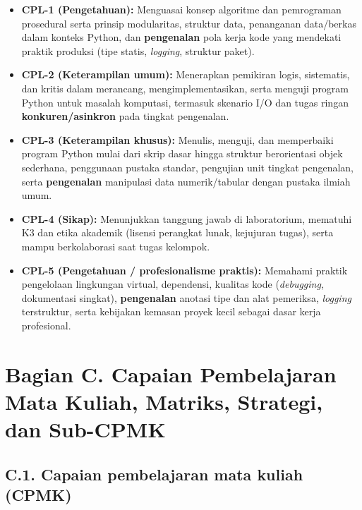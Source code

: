 \documentclass[12pt,a4paper]{article}
\begin{document}
\begin{itemize}[leftmargin=*]
  \item \textbf{CPL-1 (Pengetahuan):} Menguasai konsep algoritme dan pemrograman prosedural serta prinsip modularitas, struktur data, penanganan data/berkas dalam konteks Python, dan \textbf{pengenalan} pola kerja kode yang mendekati praktik produksi (tipe statis, \textit{logging}, struktur paket).
  \item \textbf{CPL-2 (Keterampilan umum):} Menerapkan pemikiran logis, sistematis, dan kritis dalam merancang, mengimplementasikan, serta menguji program Python untuk masalah komputasi, termasuk skenario I/O dan tugas ringan \textbf{konkuren/asinkron} pada tingkat pengenalan.
  \item \textbf{CPL-3 (Keterampilan khusus):} Menulis, menguji, dan memperbaiki program Python mulai dari skrip dasar hingga struktur berorientasi objek sederhana, penggunaan pustaka standar, pengujian unit tingkat pengenalan, serta \textbf{pengenalan} manipulasi data numerik/tabular dengan pustaka ilmiah umum.
  \item \textbf{CPL-4 (Sikap):} Menunjukkan tanggung jawab di laboratorium, mematuhi K3 dan etika akademik (lisensi perangkat lunak, kejujuran tugas), serta mampu berkolaborasi saat tugas kelompok.
  \item \textbf{CPL-5 (Pengetahuan / profesionalisme praktis):} Memahami praktik pengelolaan lingkungan virtual, dependensi, kualitas kode (\textit{debugging}, dokumentasi singkat), \textbf{pengenalan} anotasi tipe dan alat pemeriksa, \textit{logging} terstruktur, serta kebijakan kemasan proyek kecil sebagai dasar kerja profesional.
\end{itemize}

\vspace{0.75cm}

\section*{Bagian C. Capaian Pembelajaran Mata Kuliah, Matriks, Strategi, dan Sub-CPMK}

\subsection*{C.1. Capaian pembelajaran mata kuliah (CPMK)}
\end{document}
